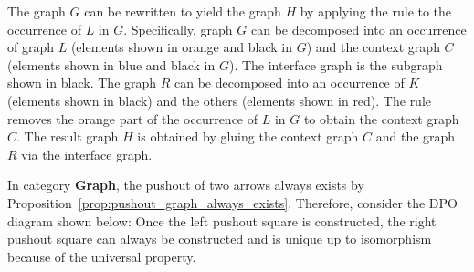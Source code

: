 The graph $G$ can be rewritten to yield the graph $H$ by applying the rule to the occurrence  of $L$ in $G$.
Specifically, graph $G$ can be decomposed into an occurrence of graph $L$ (elements shown in orange and black in $G$) and the context graph $C$ (elements shown in blue and black in $G$). The interface graph is the subgraph shown in black.
The graph $R$ can be decomposed into an occurrence of $K$ (elements shown in black) and the others (elements shown in red).
The rule removes the orange part of the occurrence of $L$ in $G$ to obtain the context graph $C$. 
The result graph $H$ is obtained by gluing the context graph $C$ and the graph $R$ via the interface graph.


In category \textbf{Graph}, the pushout of two arrows always exists by Proposition~\ref{prop:pushout_graph_always_exists}. Therefore, consider the DPO diagram shown
below:
 Once the left pushout square is constructed, the right pushout square can always be constructed and is unique up to isomorphism because of the universal property.
\begin{center}
    \end{center}

